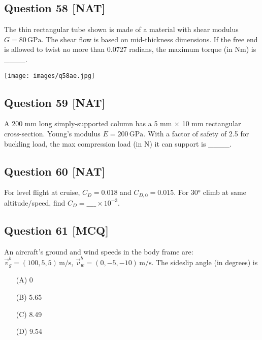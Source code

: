 \documentclass[12pt,a4paper]{article}
\begin{document}
\vspace{0.5cm}

\subsection*{Question 58 [NAT]}
The thin rectangular tube shown is made of a material with shear modulus \( G = 80 \, \text{GPa} \). The shear flow is based on mid-thickness dimensions. If the free end is allowed to twist no more than 0.0727 radians, the maximum torque (in Nm) is \_\_\_\_.

\texttt{[image: images/q58ae.jpg]}

\vspace{0.5cm}

\subsection*{Question 59 [NAT]}
A 200 mm long simply-supported column has a 5 mm × 10 mm rectangular cross-section. Young's modulus \( E = 200 \, \text{GPa} \). With a factor of safety of 2.5 for buckling load, the max compression load (in N) it can support is \_\_\_\_.


\vspace{0.5cm}

\subsection*{Question 60 [NAT]}
For level flight at cruise, \( C_D = 0.018 \) and \( C_{D,0} = 0.015 \).  
For 30° climb at same altitude/speed, find \( C_D = \_\_\_\_ \times 10^{-3} \).

\vspace{0.5cm}

\subsection*{Question 61 [MCQ]}
An aircraft's ground and wind speeds in the body frame are:  
\( \vec{v}_g^b = (100, 5, 5) \, \text{m/s} \), \( \vec{v}_w^b = (0, -5, -10) \, \text{m/s} \).  
The sideslip angle (in degrees) is  
\begin{itemize}
\item[(A)] 0  
\item[(B)] 5.65  
\item[(C)] 8.49  
\item[(D)] 9.54  
\end{itemize}
\end{document}

